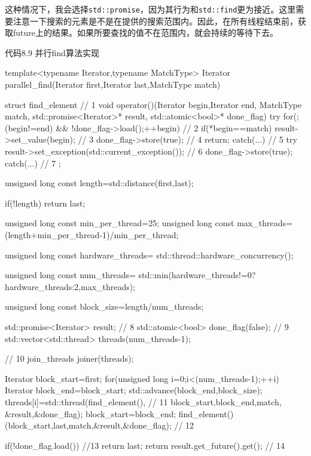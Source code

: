 这种情况下，我会选择\texttt{std::promise}，因为其行为和\texttt{std::find}更为接近。这里需要注意一下搜索的元素是不是在提供的搜索范围内。因此，在所有线程结束前，获取future上的结果。如果所要查找的值不在范围内，就会持续的等待下去。

代码8.9 并行find算法实现

\begin{cpp}
template<typename Iterator,typename MatchType>
Iterator parallel_find(Iterator first,Iterator last,MatchType match)
{
  struct find_element  // 1
  {
    void operator()(Iterator begin,Iterator end,
                    MatchType match,
                    std::promise<Iterator>* result,
                    std::atomic<bool>* done_flag)
    {
      try
      {
        for(;(begin!=end) && !done_flag->load();++begin)  // 2
        {
          if(*begin==match)
          {
            result->set_value(begin);  // 3
            done_flag->store(true);  // 4
            return;
          }
        }
      }
      catch(...)  // 5
      {
        try
        {
          result->set_exception(std::current_exception());  // 6
          done_flag->store(true);
        }
        catch(...)  // 7
        {}
      }
    }
  };

  unsigned long const length=std::distance(first,last);

  if(!length)
    return last;

  unsigned long const min_per_thread=25;
  unsigned long const max_threads=
    (length+min_per_thread-1)/min_per_thread;

  unsigned long const hardware_threads=
    std::thread::hardware_concurrency();

  unsigned long const num_threads=
    std::min(hardware_threads!=0?hardware_threads:2,max_threads);

  unsigned long const block_size=length/num_threads;

  std::promise<Iterator> result;  // 8
  std::atomic<bool> done_flag(false);  // 9
  std::vector<std::thread> threads(num_threads-1);
  {  // 10
    join_threads joiner(threads);

    Iterator block_start=first;
    for(unsigned long i=0;i<(num_threads-1);++i)
    {
      Iterator block_end=block_start;
      std::advance(block_end,block_size);
      threads[i]=std::thread(find_element(),  // 11
                             block_start,block_end,match,
                             &result,&done_flag);
      block_start=block_end;
    }
    find_element()(block_start,last,match,&result,&done_flag);  // 12
  }
  if(!done_flag.load())  //13
  {
    return last;
  }
  return result.get_future().get();  // 14
}
\end{cpp}

